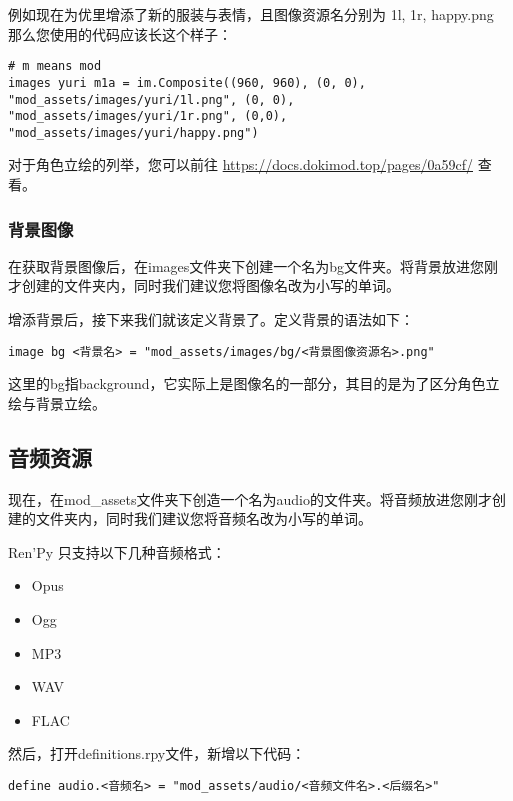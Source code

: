 \documentclass[../../Main.tex]{subfiles}
\begin{document}
例如现在为优里增添了新的服装与表情，且图像资源名分别为 1l, 1r, happy.png
那么您使用的代码应该长这个样子：
\begin{lstlisting}
# m means mod
images yuri m1a = im.Composite((960, 960), (0, 0), "mod_assets/images/yuri/1l.png", (0, 0), "mod_assets/images/yuri/1r.png", (0,0), "mod_assets/images/yuri/happy.png")
\end{lstlisting}


对于角色立绘的列举，您可以前往 \url{https://docs.dokimod.top/pages/0a59cf/} 查看。

\subsubsection{背景图像}
在获取背景图像后，在images文件夹下创建一个名为bg文件夹。将背景放进您刚才创建的文件夹内，同时我们建议您将图像名改为小写的单词。

增添背景后，接下来我们就该定义背景了。定义背景的语法如下：

\begin{lstlisting}
image bg <背景名> = "mod_assets/images/bg/<背景图像资源名>.png"
\end{lstlisting}

\begin{ExtraKnowledge}
    这里的bg指background，它实际上是图像名的一部分，其目的是为了区分角色立绘与背景立绘。
\end{ExtraKnowledge}

\subsection{音频资源}
现在，在mod\_assets文件夹下创造一个名为audio的文件夹。将音频放进您刚才创建的文件夹内，同时我们建议您将音频名改为小写的单词。

\begin{Warning}
    Ren'Py 只支持以下几种音频格式：
    \begin{itemize}
        \item Opus
        \item Ogg
        \item MP3
        \item WAV
        \item FLAC
    \end{itemize}
\end{Warning}

然后，打开definitions.rpy文件，新增以下代码：
\begin{lstlisting}
define audio.<音频名> = "mod_assets/audio/<音频文件名>.<后缀名>"
\end{lstlisting}
\end{document}
